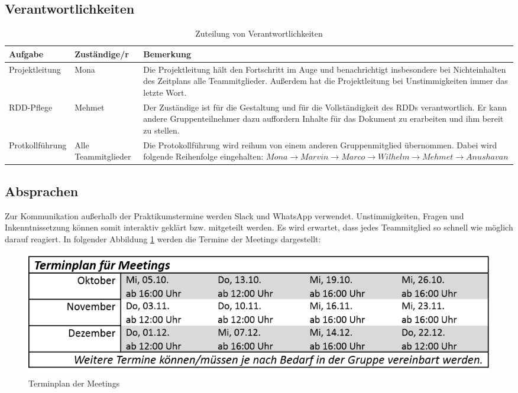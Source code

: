 \documentclass[a4paper, 11pt]{article}
\begin{document}
\subsection{Verantwortlichkeiten}\label{vantw}
\begin{table}[h]
\center
\begin{tabularx}{\textwidth}{|l|l|X|}
\hline
\textbf{Aufgabe}&\textbf{Zuständige/r}&\textbf{Bemerkung}\\
\hline
Projektleitung&Mona&Die Projektleitung hält den Fortschritt im Auge und benachrichtigt insbesondere bei Nichteinhalten des Zeitplans alle Teammitglieder. Außerdem hat die Projektleitung bei Unstimmigkeiten immer das letzte Wort. \\
\hline
RDD-Pflege&Mehmet&Der Zuständige ist für die Gestaltung und für die Vollständigkeit des RDDs verantwortlich. Er kann andere Gruppenteilnehmer dazu auffordern Inhalte für das Dokument zu erarbeiten und ihm bereit zu stellen. \\
\hline 
Protkollführung&Alle Teammitglieder&Die Protokollführung wird reihum von einem anderen Gruppenmitglied übernommen. Dabei wird folgende Reihenfolge eingehalten: $Mona\rightarrow Marvin\rightarrow Marco \rightarrow Wilhelm\rightarrow Mehmet\rightarrow Anushavan$ \\
\hline
\end{tabularx}
\caption{Zuteilung von Verantwortlichkeiten}
\label{labelname}
\end{table}

\subsection{Absprachen}
Zur Kommunikation außerhalb der Praktikumstermine werden Slack und WhatsApp verwendet. Unstimmigkeiten, Fragen und Inkenntnissetzung können somit interaktiv geklärt bzw. mitgeteilt werden. Es wird erwartet, dass jedes Teammitglied so schnell wie möglich darauf reagiert. In folgender Abbildung \ref{meets} werden die Termine der Meetings dargestellt:
\begin{figure}[h]
\centering 
\includegraphics[scale=0.85]{images/Terminplan_Meetings.png}
\caption{Terminplan der Meetings}
\label{meets}
\end{figure}
\end{document}
